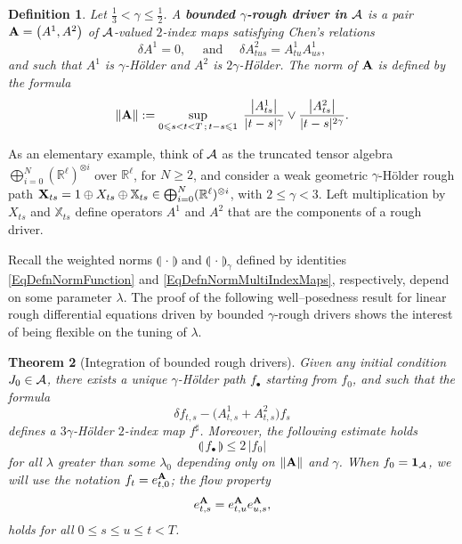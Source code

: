 \documentclass[11pt,a4paper]{amsart}
\newcommand{\RR}{\mathbb{R}}  \newcommand{\CC}{\mathbb{C}}  \newcommand{\LL}{\mathbb{L}}  \newcommand{\WW}{\mathbb{W}}
\newcommand{\bbX}{\mathbb{X}}
\renewcommand{\leq}{\leqslant}
\renewcommand{\geq}{\geqslant}
\newtheorem{thm}{\hspace{-0.15cm}  {\sc Theorem} } %
\newtheorem{defn}[thm]{ \hspace{-0.3cm} {\sc Definition}}%
\numberwithin{equation}{section} %
\begin{document}
\begin{defn}
Let $\frac{1}{3}<\gamma\leq \frac{1}{2}$. A \textbf{\emph{bounded $\gamma$-rough driver in $\mathcal{A}$}} is a pair ${\bf A}= \big(A^1,A^2\big)$ of $\mathcal{A}$-valued $2$-index maps satisfying \emph{Chen's relations}
\begin{equation}
\label{EqChenRelations}
\delta A^1=0, \quad \textrm{ and }\quad \delta A^2_{tus} = A^1_{tu}A^1_{us},
\end{equation}
and such that $A^1$ is $\gamma$-H\"older and $A^2$ is $2\gamma$-H\"older. The norm of $\bf A$ is defined by the formula
$$
\| {\bf A} \| := \sup_{0\leq s<t<T\,;\,t-s\leq 1}\;\frac{\big|A^1_{ts}\big|}{|t-s|^\gamma}\vee\frac{\big|A^2_{ts}\big|}{|t-s|^{2\gamma}}.
$$
\end{defn}

\medskip

As an elementary example, think of $\mathcal{A}$ as the truncated tensor algebra $\bigoplus_{i=0}^N(\RR^\ell)^{\otimes i}$ over $\RR^\ell$, for $N\geq 2$, and consider a weak geometric $\gamma$-H\"older rough path ${\bfX}_{ts} = 1\oplus X_{ts}\oplus \bbX_{ts}\in\bigoplus_{i=0}^N(\RR^\ell)^{\otimes i}$, with $2\leq \gamma<3$. Left multiplication by $X_{ts}$ and $\bbX_{ts}$ define operators $A^1$ and $A^2$ that are the components of a rough driver.

\medskip

Recall the weighted norms $\llparenthesis\,\cdot\,\rrparenthesis$ and $\llparenthesis\,\cdot\,\rrparenthesis_\gamma$ defined by identities \eqref{EqDefnNormFunction} and \eqref{EqDefnNormMultiIndexMaps}, respectively, depend on some parameter $\lambda$. The proof of the following well--posedness result for linear rough differential equations driven by bounded $\gamma$-rough drivers shows the interest of being flexible on the tuning of $\lambda$.

\begin{thm}[Integration of bounded rough drivers]
\label{ThmIntegrationLinearBounded}
Given any initial condition $J_0\in\mathcal{A}$, there  exists a unique $\gamma$-H\"older path $f_\bullet$ starting from $f_0$, and such that the formula 
  \begin{equation*}
    \delta f_{t, s} - \Big(A^1_{t, s} +A^2_{t, s}\Big) f_s 
  \end{equation*}
defines a $3\gamma$-H\"older $2$-index map $f^\sharp$. Moreover, the following estimate holds
  \begin{equation}
  \label{EqLinearBound}
    \llparenthesis\, f_\bullet \,\rrparenthesis \leqslant 2\,\big| f_0 \big|
  \end{equation}
for all $\lambda$ greater than some $\lambda_0$ depending only on $\| \bf A \|$ and $\gamma$. When $f_0  ={\bf 1}_{\mathcal{A}}$, we will use the notation $ f_t =e^{\bf A}_{t,0}$; the flow property
$$
e^{\bf A}_{t, s} = e^{\bf A}_{t, u} e^{\bf A}_{u, s},
$$
holds for all $0\leq s\leq u\leq t<T$.
\end{thm}
\end{document}
